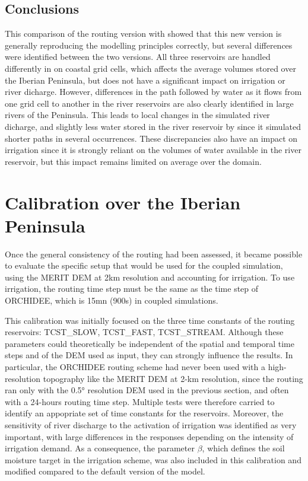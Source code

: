 \subsection{Conclusions}

This comparison of the \native routing version with \std showed that this new version is generally reproducing the modelling principles correctly, but several differences were identified between the two versions. All three reservoirs are handled differently in \native on coastal grid cells, which affects the average volumes stored over the Iberian Peninsula, but does not have a significant impact on irrigation or river dicharge. However, differences in the path followed by water as it flows from one grid cell to another in the river reservoirs are also clearly identified in large rivers of the Peninsula. This leads to local changes in the simulated river dicharge, and slightly less water stored in the river reservoir by \native since it simulated shorter paths in several occurrences. These discrepancies also have an impact on irrigation since it is strongly reliant on the volumes of water available in the river reservoir, but this impact remains limited on average over the domain.

\section{Calibration over the Iberian Peninsula}
\label{section:calib}

Once the general consistency of the \native routing had been assessed, it became possible to evaluate the specific setup that would be used for the coupled simulation, using the MERIT DEM at 2km resolution and accounting for irrigation. To use irrigation, the routing time step must be the same as the time step of ORCHIDEE, which is 15mn (900s) in coupled simulations. 

This calibration was initially focused on the three time constants of the routing reservoirs: TCST\_SLOW, TCST\_FAST, TCST\_STREAM. Although these parameters could theoretically be independent of the spatial and temporal time steps and of the DEM used as input, they can strongly influence the results. %
In particular, the ORCHIDEE routing scheme had never been used with a high-resolution topography like the MERIT DEM at 2-km resolution, since the \std routing ran only with the 0.5° resolution DEM used in the previous section, and often with a 24-hours routing time step. Multiple tests were therefore carried to identify an appopriate set of time constants for the reservoirs.
Moreover, the sensitivity of river discharge to the activation of irrigation was identified as very important, with large differences in the responses depending on the intensity of irrigation demand. As a consequence, the parameter $\beta$, which defines the soil moisture target in the irrigation scheme, was also included in this calibration and modified compared to the default version of the model.

